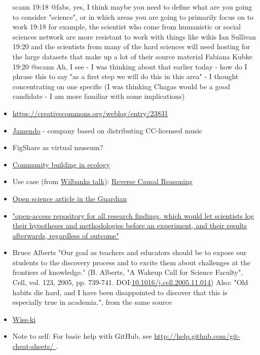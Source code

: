 \documentclass[final,authoryear,3p]{elsarticle-open-drafting}
\begin{document}
\begin{itemize}
scann 19:18 
@fabs, yes, I think maybe you need to define what are you going to consider "science", or in which areas you are going to primarily focus on to work
19:18
for example, the scientist who come from humanistic or social sciences network are more resistant to work with things like wikis
Ian Sullivan 19:20 
and the scientists from many of the hard sciences will need hosting for the large datasets that make up a lot of their source material
Fabiana Kubke 19:20 
@scann Ah, I see - I was thinking about that earlier today - how do I phrase this to say "as a first step we will do this in this area" - I thought concentrating on one specific (I was thinking Chagas would be a good candidate - I am more familiar with some implications)
	\item \href{https://creativecommons.org/weblog/entry/23831}{https://creativecommons.org/weblog/entry/23831}
	\item \href{http://www.jamendo.com/en/creativecommons}{Jamendo} - company based on distributing CC-licensed music
	\item FigShare as virtual museum?
	\item \href{http://dx.doi.org/10.1038/npre.2010.4603.1}{Community building in ecology}
	\item Use case (from \href{}{Wilbanks talk}): \href{http://selventa.com/technology/white-papers}{Reverse Causal Reasoning}
	\item \href{http://www.guardian.co.uk/education/2011/may/22/open-science-shared-research-internet}{Open science article in the Guardian}
	\item \href{http://www.nature.com/news/2011/110223/full/470437a.html}{"open-access repository for all research findings, which would let scientists log their hypotheses and methodologies before an experiment, and their results afterwards, regardless of outcome"}
	\item Bruce Alberts "Our goal as teachers and educators should be to expose our students to the discovery process and to excite them about challenges at the frontiers of knowledge." (B. Alberts, "A Wakeup Call for Science Faculty", Cell, vol. 123, 2005, pp. 739-741. DOI:\href{http://dx.doi.org/10.1016/j.cell.2005.11.014}{10.1016/j.cell.2005.11.014})
	Also: "Old habits die hard, and I have been disappointed to discover that this is especially true in academia.", from the same source
	\item \href{http://wiss-ki.eu/}{Wiss-ki}
	\item Note to self: For basic help with GitHub, see \href{http://help.github.com/git-cheat-sheets/}{http://help.github.com/git-cheat-sheets/ } .
\end{itemize}
\end{document}
